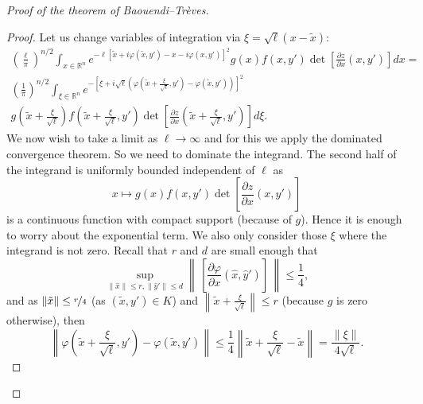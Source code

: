 \documentclass[12pt,openany]{book}
\newcommand{\snorm}[1]{\lVert {#1} \rVert}
\newcommand{\norm}[1]{\left\lVert {#1} \right\rVert}
\newcommand{\R}{{\mathbb{R}}}
\theoremstyle{plain}
\theoremstyle{remark}
\theoremstyle{definition}
\theoremstyle{exercise}
\theoremstyle{example}
\begin{document}
\begin{proof}[Proof of the theorem of Baouendi--Tr{\`e}ves]
\begin{proof}
Let us change variables of integration via $\xi = \sqrt{\ell} ( x-\tilde{x})$:
\begin{multline*}
{\left(\frac{\ell}{\pi}\right)}^{n/2}
\int_{x \in \R^n}
e^{  -\ell [\tilde{x}+i\varphi(\tilde{x},y') - x-i\varphi(x,y')]^2 } g(x) f(x,y')
\det \left[\frac{\partial z}{\partial x}(x,y')\right] dx
=
\\
{\left(\frac{1}{\pi}\right)}^{n/2}
\int_{\xi \in \R^n}
e^{-{\left[\xi +
i\sqrt{\ell}\left(\varphi\left(\tilde{x}+\frac{\xi}{\sqrt{\ell}},y'\right) -
\varphi(\tilde{x},y')\right)\right  ]}^2}
\\
g\left(\tilde{x}+\frac{\xi}{\sqrt{\ell}}\right)
f\left(\tilde{x}+\frac{\xi}{\sqrt{\ell}},y'\right)
\det \left[\frac{\partial z}{\partial
x}\left(\tilde{x}+\frac{\xi}{\sqrt{\ell}},y'\right)\right] d\xi .
\end{multline*}
We now wish to take a limit as $\ell \to \infty$ and for this we apply
the dominated convergence theorem.
So we need to dominate the integrand.
The second half of the integrand is uniformly bounded independent of
$\ell$ as
\begin{equation*}
x \mapsto g(x) f(x,y') \det \left[\frac{\partial z}{\partial x}(x,y')\right]
\end{equation*}
is a continuous function with compact support (because of $g$).
Hence it is enough to worry about the exponential term.
We also only consider those $\xi$ where the integrand is not zero.
Recall that $r$ and $d$ are small enough that
\begin{equation*}
\sup_{\snorm{\hat{x}} \leq r, \snorm{\hat{y}'} \leq d}
\norm{\,\left[
\frac{ \partial \varphi}{\partial  x}(\hat{x},\hat{y}')
\right]\,} \leq \frac{1}{4} ,
\end{equation*}
and as $\snorm{\tilde{x}} \leq \nicefrac{r}{4}$ (as
$(\tilde{x},y') \in K$) and
$\norm{\tilde{x}+\frac{\xi}{\sqrt{\ell}}} \leq r$ (because $g$ is
zero otherwise), then
\begin{equation*}
\norm{\varphi\left(\tilde{x}+\frac{\xi}{\sqrt{\ell}},y'\right) -
\varphi(\tilde{x},y')}
\leq \frac{1}{4} \norm{\tilde{x}+\frac{\xi}{\sqrt{\ell}}-\tilde{x}} =
\frac{\snorm{\xi}}{4 \sqrt{\ell}} .
\end{equation*}


\end{proof}
\end{proof}
\end{document}
